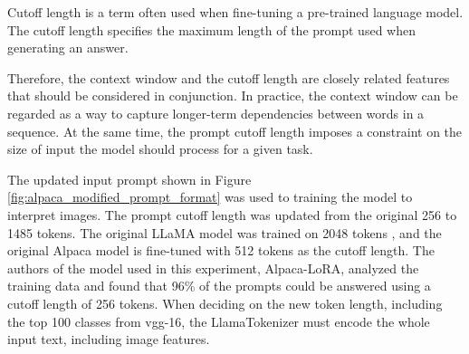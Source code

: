         Cutoff length is a term often used when fine-tuning a pre-trained language model. The cutoff length specifies the maximum length of the prompt used when generating an answer.

        Therefore, the context window and the cutoff length are closely related features that should be considered in conjunction. In practice, the context window can be regarded as a way to capture longer-term dependencies between words in a sequence. At the same time, the prompt cutoff length imposes a constraint on the size of input the model should process for a given task.
        

        The updated input prompt shown in Figure \ref{fig:alpaca_modified_prompt_format} was used to training the model to interpret images. The prompt cutoff length was updated from the original 256 to 1485 tokens. The original LLaMA model was trained on 2048 tokens \cite{SequenceContextLength}, and the original Alpaca model is fine-tuned with 512 tokens as the cutoff length. The authors of the model used in this experiment, Alpaca-LoRA, analyzed the training data and found that 96\% of the prompts could be answered using a cutoff length of 256 tokens. 
        When deciding on the new token length, including the top 100 classes from \gls{vgg}-16, the LlamaTokenizer must encode the whole input text, including image features.  
        

